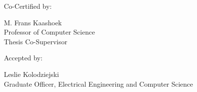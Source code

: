 \documentclass[fontsize=12pt,paper=letter]{scrartcl}
\begin{document}
\begin{titlepage}
  \vspace{\baselineskip}
  {
  \raggedright
  Co-Certified by: \dotfill

  \raggedleft
  M. Frans Kaashoek\\
  Professor of Computer Science\\
  Thesis Co-Supervisor\\
  }

  \vspace{\baselineskip}
  {
  \raggedright
  Accepted by: \dotfill

  \raggedleft
  Leslie Kolodziejski\\
  Graduate Officer, Electrical Engineering and Computer Science\\
  }
\end{titlepage}
\end{document}
